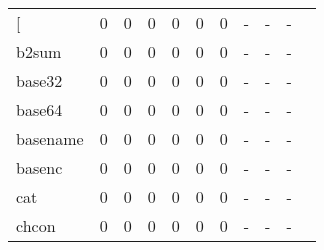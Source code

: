 \begin{longtable}{lp{1.10cm}p{1.10cm}p{1.10cm}p{1.10cm}p{1.10cm}p{1.10cm}p{1.10cm}p{1.10cm}p{1.10cm}p{1.10cm}}
\bottomrule
\endlastfoot
{[}         &                      0 &                                  0 &                                 0 &                                0 &                                 0 &                               0 &                              - &                                     - &                                   - \\
b2sum     &                      0 &                                  0 &                                 0 &                                0 &                                 0 &                               0 &                              - &                                     - &                                   - \\
base32    &                      0 &                                  0 &                                 0 &                                0 &                                 0 &                               0 &                              - &                                     - &                                   - \\
base64    &                      0 &                                  0 &                                 0 &                                0 &                                 0 &                               0 &                              - &                                     - &                                   - \\
basename  &                      0 &                                  0 &                                 0 &                                0 &                                 0 &                               0 &                              - &                                     - &                                   - \\
basenc    &                      0 &                                  0 &                                 0 &                                0 &                                 0 &                               0 &                              - &                                     - &                                   - \\
cat       &                      0 &                                  0 &                                 0 &                                0 &                                 0 &                               0 &                              - &                                     - &                                   - \\
chcon     &                      0 &                                  0 &                                 0 &                                0 &                                 0 &                               0 &                              - &                                     - &                                   - \\

\end{longtable}
